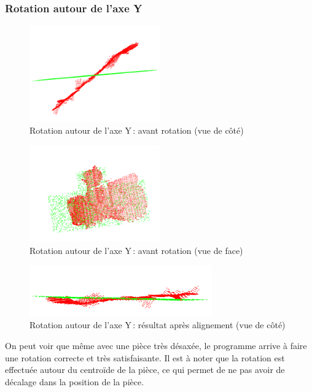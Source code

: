 \clearpage
\subsubsection{Rotation autour de l'axe Y}
\begin{figure}[H]
    \centering
    \includegraphics[width=0.50\textwidth]{assets/figures/rote_y_avt_cote.png}
    \caption{Rotation autour de l’axe Y : avant rotation (vue de côté)}
    \label{fig:rot_y_avt_cote}
\end{figure}
\begin{figure}[H]
    \centering
    \includegraphics[width=0.50\textwidth]{assets/figures/rote_y_avt_face.png}
    \caption{Rotation autour de l’axe Y : avant rotation (vue de face)}
    \label{fig:rot_y_avt_face}
\end{figure}
\begin{figure}[H]
    \centering
    \includegraphics[width=0.70\textwidth]{assets/figures/rot_y_aprs_cote.png}
    \caption{Rotation autour de l’axe Y : résultat après alignement (vue de côté)}
    \label{fig:rot_y_aprs_cote}
\end{figure}
On peut voir que même avec une pièce très désaxée, le programme arrive à faire une rotation correcte et très satisfaisante. Il est à noter que la rotation est effectuée autour du centroïde de la pièce, ce qui permet de ne pas avoir de décalage dans la position de la pièce.

